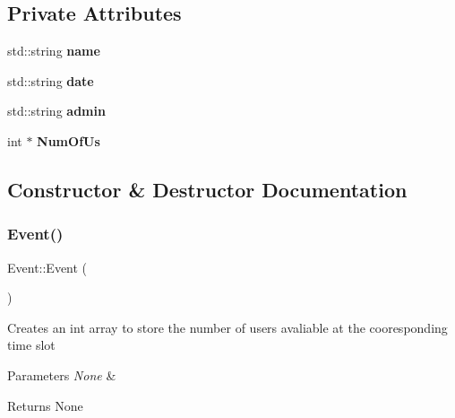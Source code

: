 \subsection*{Private Attributes}
\begin{DoxyCompactItemize}
\item 
\mbox{\label{class_event_ae116bf76fb01a92e000579a5a0d6f35c}} 
std\+::string {\bfseries name}
\item 
\mbox{\label{class_event_a9a93c9d38211f84cd6e347690e177f11}} 
std\+::string {\bfseries date}
\item 
\mbox{\label{class_event_a1c05237981f4681c77d268bb4f37183a}} 
std\+::string {\bfseries admin}
\item 
\mbox{\label{class_event_a182ae5c5d2a1e4f5a5989a8f9f5e84b5}} 
int $\ast$ {\bfseries Num\+Of\+Us}
\end{DoxyCompactItemize}


\subsection{Constructor \& Destructor Documentation}
\mbox{\label{class_event_a5a40dd4708297f7031e29b39e039ae10}} 
\subsubsection{\texorpdfstring{Event()}{Event()}\hspace{0.1cm}{\footnotesize\ttfamily [1/2]}}
{\footnotesize\ttfamily Event\+::\+Event (\begin{DoxyParamCaption}{ }\end{DoxyParamCaption})}

Creates an int array to store the number of users avaliable at the cooresponding time slot 
\begin{DoxyParams}{Parameters}
{\em None} & \\
\hline
\end{DoxyParams}
\begin{DoxyReturn}{Returns}
None 
\end{DoxyReturn}
\mbox{\label{class_event_adcbdd318d0c3237e2e829549fd426d70}} 
